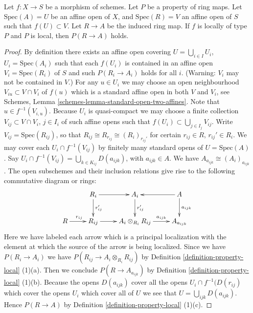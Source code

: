 \begin{lemma}
\label{lemma-locally-P}
Let $f : X \to S$ be a morphism of schemes.
Let $P$ be a property of ring maps.
Let $\text{Spec}(A) = U$ be an affine open of $X$,
and $\text{Spec}(R) = V$ an affine open of $S$ such that
$f(U) \subset V$. Let $R \to A$ be the induced ring map.
If $f$ is locally of type $P$ and $P$ is local,
then $P(R \to A)$ holds.
\end{lemma}

\begin{proof}
By definition there exists an affine open covering
$U = \bigcup_{i \in I} U_i$, $U_i = \text{Spec}(A_i)$ such that each $f(U_i)$
is contained in an affine open $V_i = \text{Spec}(R_i)$ of $S$
and such $P(R_i \to A_i)$ holds for all $i$.
(Warning: $V_i$ may not be contained in $V$.)
For any $u \in U_i$ we may choose an open neighbourhood
$V_{iu} \subset V \cap V_i$ of $f(u)$ which is a standard affine
open in both $V$ and $V_i$, see
Schemes, Lemma \ref{schemes-lemma-standard-open-two-affines}.
Note that $u \in f^{-1}(V_{i, u})$.
Because $U_i$ is quasi-compact we may choose a finite
collection $V_{ij} \subset V \cap V_i$, $j \in I_i$ of such affine opens
such that $f(U_i) \subset \bigcup_{j \in I_j} V_{ij}$.
Write $V_{ij} = \text{Spec}(R_{ij})$, so that
$R_{ij} \cong R_{r_{ij}} \cong (R_i)_{r_{ij}'}$ for certain
$r_{ij} \in R$, $r_{ij}' \in R_i$.
We may cover each $U_i \cap f^{-1}(V_{ij})$
by finitely many standard opens of $U = \text{Spec}(A)$.
Say $U_i \cap f^{-1}(V_{ij}) = \bigcup_{k \in K_{ij}} D(a_{ijk})$,
with $a_{ijk} \in A$. We have $A_{a_{ijk}} \cong (A_i)_{a_{ijk}}$.
The open subschemes and their inclusion relations give rise
to the following commutative diagram or rings:
$$
\xymatrix{
& R_i \ar[r] \ar[d]^{r_{ij}'} & A_i \ar[d]^{r_{ij}'}
& A \ar[l] \ar[d]^{a_{ijk}}\\
R \ar[r]^{r_{ij}} & R_{ij} \ar[r] & A_i \otimes_{R_i} R_{ij} \ar[r]^-{a_{ijk}}
& A_{a_{ijk}}
}
$$
Here we have labeled each arrow which is a principal localization with
the element at which the source of the arrow is being localized.
Since we have $P(R_i \to A_i)$ we have
$P(R_{ij} \to A_i \otimes_{R_i} R_{ij})$ by
Definition \ref{definition-property-local} (1)(a).
Then we conclude $P(R \to A_{a_{ijk}})$ by
Definition \ref{definition-property-local} (1)(b).
Because the opens $D(a_{ijk})$ cover all the opens
$U_i \cap f^{-1}(D(r_{ij})$ which cover the opens $U_i$
which cover all of $U$ we see that $U = \bigcup_{ijk} D(a_{ijk})$.
Hence $P(R \to A)$ by Definition \ref{definition-property-local} (1)(c).
\end{proof}

